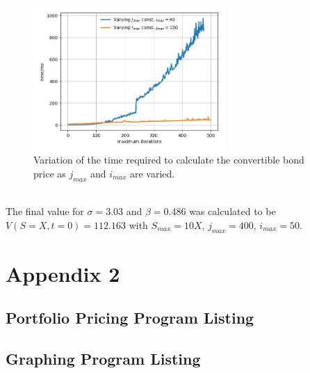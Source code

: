 \documentclass{article}
\begin{document}
\begin{figure}[!h]
\includegraphics[width=0.65\textwidth,center]{../images/european_time.png}
\caption{Variation of the time required to calculate the convertible bond price as $j_{max}$ and $i_{max}$ are varied.}
\label{fig:varying_smax}
\end{figure}
\\
The final value for $\sigma=3.03$ and $\beta=0.486$ was calculated to be $V(S=X,t=0)=112.163$ with $S_{max}=10X$, $j_{max}=400$, $i_{max}=50$.
\clearpage


\clearpage
\section*{Appendix 2}
\lstset{style=mystyle}
\subsection*{Portfolio Pricing Program Listing}

\subsection*{Graphing Program Listing}


\end{document}
